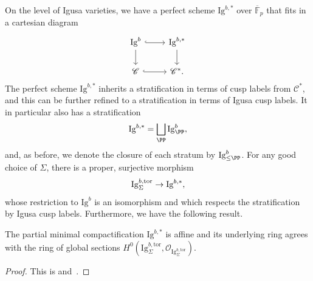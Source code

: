 \documentclass[letterpaper,11pt]{amsart}
\begin{document}
On the level of Igusa varieties, we have a perfect scheme $\mathrm{Ig}^{b,*}$ over $\overline{\mathbb{F}}_p$ that fits in a cartesian diagram 
\begin{equation}{\label{eqn: BoundaryDecompositionofPerfectIgusaVariety}}
\begin{tikzcd}
\mathrm{Ig}^b \arrow[d] \arrow[r, hook] & \mathrm{Ig}^{b,*}\arrow[d] \\ 
\mathscr{C} \arrow[r, hook] & \mathscr{C}^{*}.
\end{tikzcd}
\end{equation}
The perfect scheme $\mathrm{Ig}^{b,*}$ inherits a stratification in terms of cusp labels from $\mathscr{C}^*$, and this can be further refined to a stratification in terms of Igusa cusp labels. It in particular also has a stratification 
\begin{equation}{\label{eqn: BailyBorelStratificationonIgusavariety}}
\mathrm{Ig}^{b,*} = \bigsqcup_{\PP}\mathrm{Ig}^b_{\PP},
\end{equation}
and, as before, we denote the closure of each stratum by $\mathrm{Ig}^b_{\leq \PP}$. For any good choice of $\Sigma$, there is a proper, surjective morphism 
\begin{equation}{\label{eqn: propermorphismofIgusavarieties}}
\mathrm{Ig}^{b,\mathrm{tor}}_{\Sigma}\to \mathrm{Ig}^{b,*},
\end{equation}
whose restriction to $\mathrm{Ig}^b$ is an isomorphism and which respects the stratification by Igusa cusp labels. Furthermore, we have the following result. 
\begin{proposition}\label{prop: globalsections}
The partial minimal compactification
$\mathrm{Ig}^{b,*}$ is affine and its underlying ring agrees with the ring of global sections $H^0\left(\mathrm{Ig}^{b,\mathrm{tor}}_{\Sigma}, \mathcal{O}_{\mathrm{Ig}^{b,\mathrm{tor}}_{\Sigma}}\right)$.     
\end{proposition}
\begin{proof}
    This is \cite[Proposition 3.3.4]{CS2} and~\cite[Proposition 3.3.5]{santos}. 
\end{proof}
\end{document}
